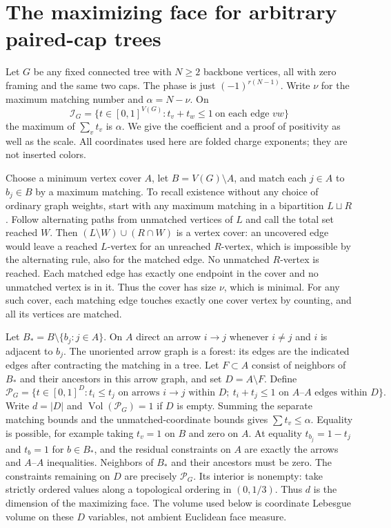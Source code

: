 \section{The maximizing face for arbitrary paired-cap trees}\label{sec:trees}

Let \(G\) be any fixed connected tree with \(N\ge2\) backbone vertices, all with zero framing and the same two caps. The phase is just \((-1)^{r(N-1)}\). Write \(\nu\) for the maximum matching number and \(\alpha=N-\nu\). On
\[
 \mathcal I_G=\{t\in[0,1]^{V(G)}: t_v+t_w\le 1\ \text{on each edge }vw\}
\]
the maximum of \(\sum_v t_v\) is \(\alpha\). We give the coefficient and a proof of positivity as well as the scale. All coordinates used here are folded charge exponents; they are not inserted colors.

Choose a minimum vertex cover \(A\), let \(B=V(G)\setminus A\), and match each \(j\in A\) to \(b_j\in B\) by a maximum matching. To recall existence without any choice of ordinary graph weights, start with any maximum matching in a bipartition \(L\sqcup R\). Follow alternating paths from unmatched vertices of \(L\) and call the total set reached \(W\). Then \((L\setminus W)\cup(R\cap W)\) is a vertex cover: an uncovered edge would leave a reached \(L\)-vertex for an unreached \(R\)-vertex, which is impossible by the alternating rule, also for the matched edge. No unmatched \(R\)-vertex is reached. Each matched edge has exactly one endpoint in the cover and no unmatched vertex is in it. Thus the cover has size \(\nu\), which is minimal. For any such cover, each matching edge touches exactly one cover vertex by counting, and all its vertices are matched.

Let \(B_*=B\setminus\{b_j:j\in A\}\). On \(A\) direct an arrow \(i\to j\) whenever \(i\ne j\) and \(i\) is adjacent to \(b_j\). The unoriented arrow graph is a forest: its edges are the indicated edges after contracting the matching in a tree. Let \(F\subset A\) consist of neighbors of \(B_*\) and their ancestors in this arrow graph, and set \(D=A\setminus F\). Define
\[
 \mathcal P_G=\{t\in[0,1]^D:t_i\le t_j\text{ on arrows }i\to j
       \text{ within }D;\ t_i+t_j\le1\text{ on }A\text{--}A
                   \text{ edges within }D\}.
\]
Write \(d=|D|\) and \(\operatorname{Vol}(\mathcal P_G)=1\) if \(D\) is empty. Summing the separate matching bounds and the unmatched-coordinate bounds gives \(\sum t_v\le\alpha\). Equality is possible, for example taking \(t_v=1\) on \(B\) and zero on \(A\). At equality \(t_{b_j}=1-t_j\) and \(t_b=1\) for \(b\in B_*\), and the residual constraints on \(A\) are exactly the arrows and \(A\)--\(A\) inequalities. Neighbors of \(B_*\) and their ancestors must be zero. The constraints remaining on \(D\) are precisely \(\mathcal P_G\). Its interior is nonempty: take strictly ordered values along a topological ordering in \((0,1/3)\). Thus \(d\) is the dimension of the maximizing face. The volume used below is coordinate Lebesgue volume on these \(D\) variables, not ambient Euclidean face measure.

